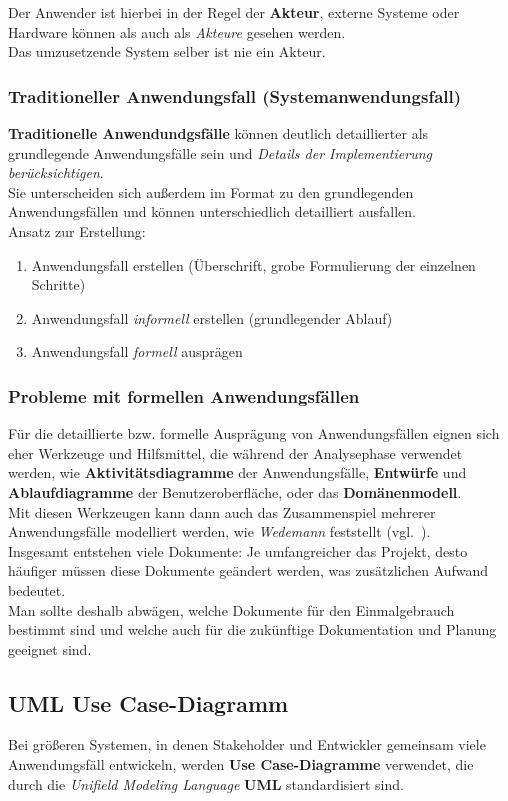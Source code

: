 \noindent
Der Anwender ist hierbei in der Regel der \textbf{Akteur}, externe Systeme oder Hardware können als auch als \textit{Akteure} gesehen werden.\\
Das umzusetzende System selber ist nie ein Akteur.

\subsubsection*{Traditioneller Anwendungsfall (Systemanwendungsfall)}
\textbf{Traditionelle Anwendundgsfälle} können deutlich detaillierter als grundlegende Anwendungsfälle sein und \textit{Details der Implementierung berücksichtigen}.\\
Sie unterscheiden sich außerdem im Format zu den grundlegenden Anwendungsfällen und können unterschiedlich detailliert ausfallen.\\

\noindent
Ansatz zur Erstellung:

\begin{enumerate}
    \item Anwendungsfall  erstellen (Überschrift, grobe Formulierung der einzelnen Schritte)
    \item Anwendungsfall \textit{informell} erstellen (grundlegender Ablauf)
    \item Anwendungsfall \textit{formell} ausprägen
\end{enumerate}


\subsubsection*{Probleme mit formellen Anwendungsfällen}
Für die detaillierte bzw. formelle Ausprägung von Anwendungsfällen eignen sich eher Werkzeuge und Hilfsmittel, die während der Analysephase verwendet werden, wie \textbf{Aktivitätsdiagramme} der Anwendungsfälle, \textbf{Entwürfe} und \textbf{Ablaufdiagramme} der Benutzeroberfläche, oder das \textbf{Domänenmodell}.\\
Mit diesen Werkzeugen kann dann auch das Zusammenspiel mehrerer Anwendungsfälle modelliert werden, wie \textit{Wedemann} feststellt (vgl.~\cite[71]{Wed09}).\\

\noindent
Insgesamt entstehen viele Dokumente: Je umfangreicher das Projekt, desto häufiger müssen diese Dokumente geändert werden, was zusätzlichen Aufwand bedeutet.\\
Man sollte deshalb abwägen, welche Dokumente für den Einmalgebrauch bestimmt sind und welche auch für die zukünftige Dokumentation und Planung geeignet sind.

\subsection*{UML Use Case-Diagramm}
Bei größeren Systemen, in denen Stakeholder und Entwickler gemeinsam viele Anwendungsfäll entwickeln, werden \textbf{Use Case-Diagramme} verwendet, die durch die \textit{Unifield Modeling Language} \textbf{UML} standardisiert sind.\\